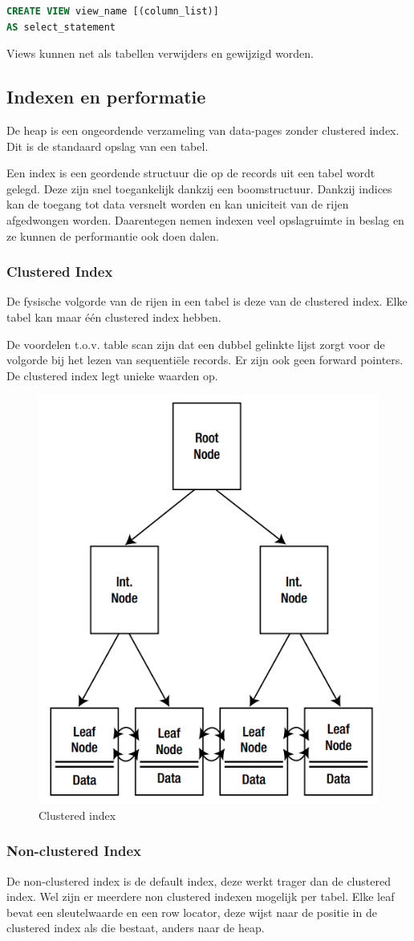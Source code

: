 \documentclass[a4paper,12pt]{article}
\begin{document}
\begin{lstlisting}[language=sql, breaklines=true]
CREATE VIEW view_name [(column_list)]
AS select_statement
\end{lstlisting}

Views kunnen net als tabellen verwijders en gewijzigd worden.

\subsection{Indexen en performatie}
De heap is een ongeordende verzameling van data-pages zonder clustered index. Dit is de standaard opslag van een tabel.

Een index is een geordende structuur die op de records uit een tabel wordt gelegd.
Deze zijn snel toegankelijk dankzij een boomstructuur.
Dankzij indices kan de toegang tot data versnelt worden en kan uniciteit van de rijen afgedwongen worden.
Daarentegen nemen indexen veel opslagruimte in beslag en ze kunnen de performantie ook doen dalen.

\subsubsection{Clustered Index}
De fysische volgorde van de rijen in een tabel is deze van de clustered index.
Elke tabel kan maar één clustered index hebben.

De voordelen t.o.v. table scan zijn dat  een dubbel gelinkte lijst zorgt voor de volgorde bij het lezen van sequentiële records.
Er zijn ook geen forward pointers.
De clustered index legt unieke waarden op.

\begin{figure}[H]
\centering
  	\includegraphics[width=.35\linewidth]{img/ClusteredIndex.png}
  	\caption{Clustered index}
  	\label{fig:ClusteredIndex}
\end{figure}

\subsubsection{Non-clustered Index}
De non-clustered index is de default index, deze werkt trager dan de clustered index.
Wel zijn er meerdere non clustered indexen mogelijk per tabel.
Elke leaf bevat een sleutelwaarde en een row locator, deze wijst naar de positie in de clustered index als die bestaat, anders naar de heap.
\end{document}
